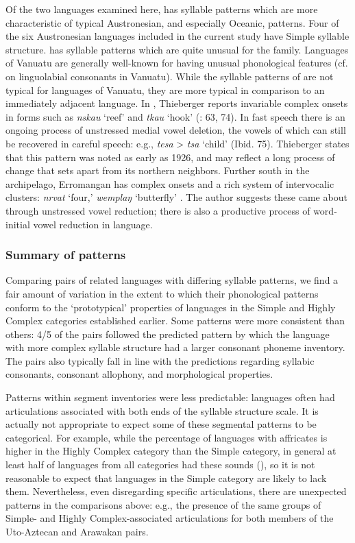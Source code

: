   Of the two languages examined here,  has syllable patterns which are more characteristic of typical Austronesian, and especially Oceanic, patterns. Four of the six Austronesian languages included in the current study have Simple syllable structure.  has syllable patterns which are quite unusual for the family. Languages of Vanuatu are generally well-known for having unusual phonological features (cf. \citealt{Maddieson1989b} on linguolabial consonants in Vanuatu). While the syllable patterns of  are not typical for languages of Vanuatu, they are more typical in comparison to an immediately adjacent language. In , Thieberger reports invariable complex onsets in forms such as \textit{nskau} ‘reef’ and \textit{tkau} ‘hook’ (\citealt{Thieberger2004}: 63, 74). In fast speech there is an ongoing process of unstressed medial vowel deletion, the vowels of which can still be recovered in careful speech: e.g., \textit{tesa} > \textit{tsa} ‘child’ (Ibid. 75). Thieberger states that this pattern was noted as early as 1926, and may reflect a long process of change that sets  apart from its northern neighbors. Further south in the archipelago, Erromangan has complex onsets and a rich system of intervocalic clusters: \textit{nrvat} ‘four,’ \textit{wemplaŋ} ‘butterfly’ \citep[20-2]{Crowley1998}. The author suggests these came about through unstressed vowel reduction; there is also a productive process of word-initial vowel reduction in language.

\subsubsection{{Summary} {of} {patterns}}\label{sec:8.4.3.7}

  Comparing pairs of related languages with differing syllable patterns, we find a fair amount of variation in the extent to which their phonological patterns conform to the ‘prototypical’ properties of languages in the Simple and Highly Complex categories established earlier. Some patterns were more consistent than others: 4/5 of the pairs followed the predicted pattern by which the language with more complex syllable structure had a larger consonant phoneme inventory. The pairs also typically fall in line with the predictions regarding syllabic consonants, consonant allophony, and morphological properties.

  Patterns within segment inventories were less predictable: languages often had articulations associated with both ends of the syllable structure scale. It is actually not appropriate to expect some of these segmental patterns to be categorical. For example, while the percentage of languages with affricates is higher in the Highly Complex category than the Simple category, in general at least half of languages from all categories had these sounds (), so it is not reasonable to expect that languages in the Simple category are likely to lack them. Nevertheless, even disregarding specific articulations, there are unexpected patterns in the comparisons above: e.g., the presence of the same groups of Simple- and Highly Complex-associated articulations for both members of the Uto-Aztecan and Arawakan pairs.

